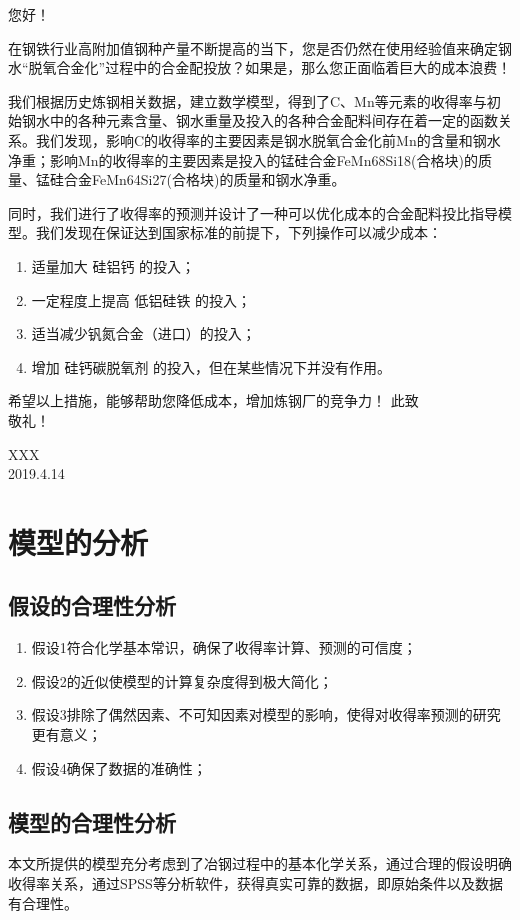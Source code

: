 \documentclass[12pt]{article}%
\begin{document}
您好！\par
在钢铁行业高附加值钢种产量不断提高的当下，您是否仍然在使用经验值来确定钢水“脱氧合金化”过程中的合金配投放？如果是，那么您正面临着巨大的成本浪费！\par
我们根据历史炼钢相关数据，建立数学模型，得到了C、Mn等元素的收得率与初始钢水中的各种元素含量、钢水重量及投入的各种合金配料间存在着一定的函数关系。我们发现，影响C的收得率的主要因素是钢水脱氧合金化前Mn的含量和钢水净重；影响Mn的收得率的主要因素是投入的锰硅合金FeMn68Si18(合格块)的质量、锰硅合金FeMn64Si27(合格块)的质量和钢水净重。\par
同时，我们进行了收得率的预测并设计了一种可以优化成本的合金配料投比指导模型。我们发现在保证达到国家标准的前提下，下列操作可以减少成本：
\begin{enumerate}
  \item 适量加大 硅铝钙 的投入；
  \item 一定程度上提高 低铝硅铁 的投入；
  \item 适当减少钒氮合金（进口）的投入；
  \item 增加 硅钙碳脱氧剂 的投入，但在某些情况下并没有作用。
\end{enumerate}
希望以上措施，能够帮助您降低成本，增加炼钢厂的竞争力！
此致\\
敬礼！
\begin{flushright}
XXX\\ 2019.4.14
\end{flushright}
\newpage
\section{模型的分析}
\subsection{假设的合理性分析}
\begin{enumerate}[1.]\addtolength{\itemsep}{-1.5ex}
\item 假设1符合化学基本常识，确保了收得率计算、预测的可信度；
\item 假设2的近似使模型的计算复杂度得到极大简化；
\item 假设3排除了偶然因素、不可知因素对模型的影响，使得对收得率预测的研究更有意义；
\item 假设4确保了数据的准确性；
\end{enumerate}
\subsection{模型的合理性分析}
本文所提供的模型充分考虑到了冶钢过程中的基本化学关系，通过合理的假设明确收得率关系，通过SPSS等分析软件，获得真实可靠的数据，即原始条件以及数据有合理性。
\end{document}
